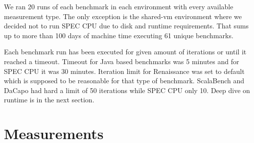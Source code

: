 \begin{table}[ht]
  \centering
  \caption{Summary of selected platforms.}
  \label{table:envs}
\end{table}

We ran 20 runs of each benchmark in each environment with every available measurement type.
The only exception is the shared-vm environment where we decided not to run SPEC CPU due to disk and runtime requirements.
That sums up to more than 100 days of machine time executing 61 unique benchmarks.

Each benchmark run has been executed for given amount of iterations or until it reached a timeout.
Timeout for Java based benchmarks was 5 minutes and for SPEC CPU it was 30 minutes.
Iteration limit for Renaissance was set to default which is supposed to be reasonable for that type of benchmark.
ScalaBench and DaCapo had hard a limit of 50 iterations while SPEC CPU only 10.
Deep dive on runtime is in the next section.

\section{Measurements}
\label{sec:measurements}

